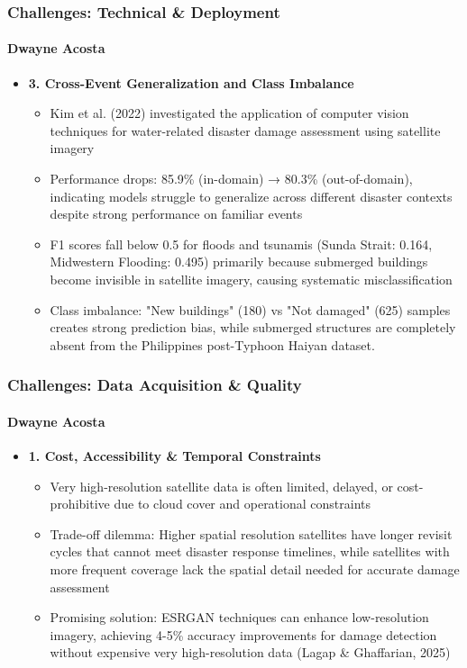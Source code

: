 \documentclass{beamer}
\newcommand{\namedframe}[3]{
  \begin{frame}
    \frametitle{#2}
    \framesubtitle{#1}
    #3
  \end{frame}
}
\begin{document}
\namedframe{Dwayne Acosta}{Challenges: Technical \& Deployment}{
\begin{itemize}
    \item \textbf{3. Cross-Event Generalization and Class Imbalance}
    \begin{itemize}
      \item Kim et al. (2022) investigated the application of computer vision techniques for water-related disaster damage assessment using satellite imagery
      \item Performance drops: 85.9\% (in-domain) → 80.3\% (out-of-domain), indicating models struggle to generalize across different disaster contexts despite strong performance on familiar events
      \item F1 scores fall below 0.5 for floods and tsunamis (Sunda Strait: 0.164, Midwestern Flooding: 0.495) primarily because submerged buildings become invisible in satellite imagery, causing systematic misclassification
      \item Class imbalance: "New buildings" (180) vs "Not damaged" (625) samples creates strong prediction bias, while submerged structures are completely absent from the Philippines post-Typhoon Haiyan dataset.
    \end{itemize}
\end{itemize}
}


\namedframe{Dwayne Acosta}{Challenges: Data Acquisition \& Quality}{
\begin{itemize}
    \item \textbf{1. Cost, Accessibility \& Temporal Constraints}
    \begin{itemize}
        \item Very high-resolution satellite data is often limited, delayed, or cost-prohibitive due to cloud cover and operational constraints
        \item Trade-off dilemma: Higher spatial resolution satellites have longer revisit cycles that cannot meet disaster response timelines, while satellites with more frequent coverage lack the spatial detail needed for accurate damage assessment
        \item Promising solution: ESRGAN techniques can enhance low-resolution imagery, achieving 4-5\% accuracy improvements for damage detection without expensive very high-resolution data (Lagap \& Ghaffarian, 2025)
    \end{itemize}
\end{itemize}
}
\end{document}
